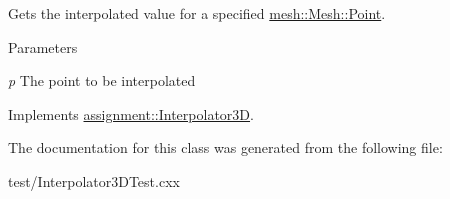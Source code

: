 Gets the interpolated value for a specified \hyperlink{structmesh_1_1_mesh_1_1_point}{mesh::Mesh::Point}. 


\begin{DoxyParams}{Parameters}
\item[{\em p}]The point to be interpolated \end{DoxyParams}


Implements \hyperlink{classassignment_1_1_interpolator3_d_ac6ed5447418b7980d5ad2f12e853b35f}{assignment::Interpolator3D}.



The documentation for this class was generated from the following file:\begin{DoxyCompactItemize}
\item 
test/Interpolator3DTest.cxx\end{DoxyCompactItemize}
